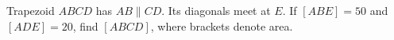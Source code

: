 Trapezoid $ ABCD $ has $ AB\parallel CD $. Its diagonals meet at $ E $. If $[ABE]=50 $ and $[ADE]=20 $, find $[ABCD]$, where brackets denote area.
